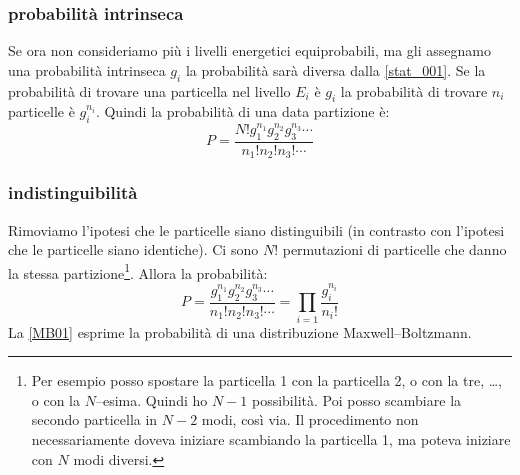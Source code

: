 \subsubsection{probabilità intrinseca}
Se ora non consideriamo più i livelli energetici equiprobabili, ma gli assegnamo una probabilità intrinseca $g_i$ la probabilità sarà diversa dalla \eqref{stat_001}. Se la probabilità di trovare una particella nel livello $E_i$ è $g_i$ la probabilità di trovare $n_i$ particelle è $g_i^{n_i}$. Quindi la probabilità di una data partizione è:
\begin{equation}
	P=\frac{N!g_1^{n_1}g_2^{n_2}g_3^{n_3}\cdots}{n_1!n_2!n_3!\cdots}
\end{equation}
\subsubsection{indistinguibilità}
Rimoviamo l'ipotesi che le particelle siano distinguibili (in contrasto con l'ipotesi che le particelle siano identiche). Ci sono $N!$ permutazioni di particelle che danno la stessa partizione\footnote{Per esempio posso spostare la particella 1 con la particella 2, o con la tre, \ldots, o con la $N$--esima. Quindi ho $N-1$ possibilità. Poi posso scambiare la secondo particella in $N-2$ modi, così via. Il procedimento non necessariamente doveva iniziare scambiando la particella 1, ma poteva iniziare con $N$ modi diversi.}. Allora la probabilità:
\begin{equation}
	P=\frac{g_1^{n_1}g_2^{n_2}g_3^{n_3}\cdots}{n_1!n_2!n_3!\cdots}=\prod_{i=1}\frac{g_i^{n_i}}{n_i!}
	\label{MB01}
\end{equation}
La \eqref{MB01} esprime la probabilità di una distribuzione Maxwell--Boltzmann.
